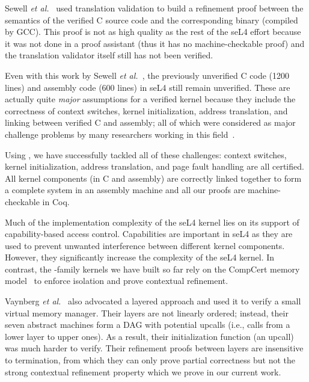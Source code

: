 {Sewell {\em et al.}~\cite{sewell13} used translation validation to
build a refinement proof between the semantics of the verified C
source code and the corresponding binary (compiled by GCC).  This
proof is not as high quality as the rest of the seL4 effort because
it was not done in a proof assistant (thus it has no machine-checkable
proof) and the translation validator itself still has not been
verified.

Even with this work by Sewell {\em et al.}~\cite{sewell13}, the
previously unverified C code (1200 lines) and assembly code (600
lines) in seL4 still remain unverified. These are actually quite {\em
  major} assumptions for a verified kernel because they include the
correctness of context switches, kernel initialization, address
translation, and linking between verified C and assembly; all of which
were considered as major challenge problems by many researchers
working in this
field~\cite{verisoft06,ni07,feng08:vstte,BedrockPLDI11,vaynberg12}.

Using \CTOS, we have successfully tackled all of these challenges:
context switches, kernel initialization, address translation, and page
fault handling are all certified. All kernel components (in C and
assembly) are correctly linked together to form a complete system in
an assembly machine and all our proofs are machine-checkable in Coq.

Much of the implementation complexity of the seL4 kernel lies on its
support of capability-based access control. Capabilities are important
in seL4 as they are used to prevent unwanted interference between
different kernel components. However, they significantly increase the
complexity of the seL4 kernel.  In contrast, the \CTOS-family kernels
we have built so far rely on the CompCert memory
model~\cite{leroy12} to enforce isolation and prove contextual
refinement.



Vaynberg {\em et al.}~\cite{vaynberg12} also advocated a layered approach
and used it to verify a small virtual memory manager. Their layers
are not linearly ordered; instead, their seven abstract machines
form a DAG with potential upcalls (i.e., calls from a lower layer to
upper ones). As a result, their initialization function (an upcall)
was much harder to verify. Their refinement proofs between layers are
insensitive to termination, from which they can only prove partial
correctness but not the strong contextual refinement property which we
prove in our current work.

}

